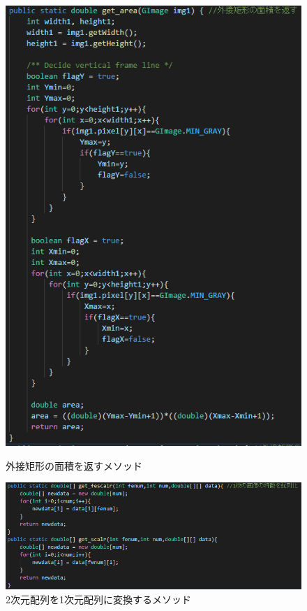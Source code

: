 \begin{itemize}
\begin{figure}[htbp]
\begin{minipage}[t]{0.45\hsize}
      \includegraphics[scale=0.3]{その他4.PNG}
      \centering
      \caption{外接矩形の面積を返すメソッド}
      \label{graph:26}
    \end{minipage}
    \begin{minipage}[t]{0.45\hsize}
      \includegraphics[scale=0.4]{その他5.PNG}
      \centering
      \caption{2次元配列を1次元配列に変換するメソッド}

\end{minipage}
\end{figure}
\end{itemize}
